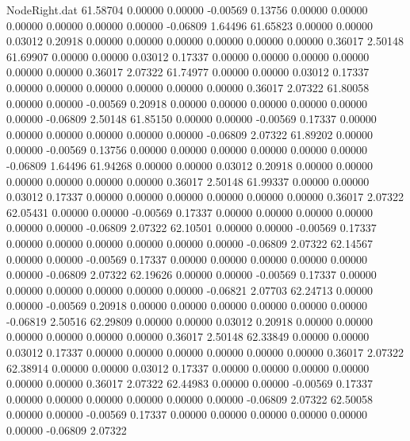 \begin{filecontents}{NodeRight.dat}
  61.58704    0.00000    0.00000    -0.00569    0.13756    0.00000    0.00000    0.00000    0.00000    0.00000    0.00000   -0.06809    1.64496
  61.65823    0.00000    0.00000     0.03012    0.20918    0.00000    0.00000    0.00000    0.00000    0.00000    0.00000    0.36017    2.50148
  61.69907    0.00000    0.00000     0.03012    0.17337    0.00000    0.00000    0.00000    0.00000    0.00000    0.00000    0.36017    2.07322
  61.74977    0.00000    0.00000     0.03012    0.17337    0.00000    0.00000    0.00000    0.00000    0.00000    0.00000    0.36017    2.07322
  61.80058    0.00000    0.00000    -0.00569    0.20918    0.00000    0.00000    0.00000    0.00000    0.00000    0.00000   -0.06809    2.50148
  61.85150    0.00000    0.00000    -0.00569    0.17337    0.00000    0.00000    0.00000    0.00000    0.00000    0.00000   -0.06809    2.07322
  61.89202    0.00000    0.00000    -0.00569    0.13756    0.00000    0.00000    0.00000    0.00000    0.00000    0.00000   -0.06809    1.64496
  61.94268    0.00000    0.00000     0.03012    0.20918    0.00000    0.00000    0.00000    0.00000    0.00000    0.00000    0.36017    2.50148
  61.99337    0.00000    0.00000     0.03012    0.17337    0.00000    0.00000    0.00000    0.00000    0.00000    0.00000    0.36017    2.07322
  62.05431    0.00000    0.00000    -0.00569    0.17337    0.00000    0.00000    0.00000    0.00000    0.00000    0.00000   -0.06809    2.07322
  62.10501    0.00000    0.00000    -0.00569    0.17337    0.00000    0.00000    0.00000    0.00000    0.00000    0.00000   -0.06809    2.07322
  62.14567    0.00000    0.00000    -0.00569    0.17337    0.00000    0.00000    0.00000    0.00000    0.00000    0.00000   -0.06809    2.07322
  62.19626    0.00000    0.00000    -0.00569    0.17337    0.00000    0.00000    0.00000    0.00000    0.00000    0.00000   -0.06821    2.07703
  62.24713    0.00000    0.00000    -0.00569    0.20918    0.00000    0.00000    0.00000    0.00000    0.00000    0.00000   -0.06819    2.50516
  62.29809    0.00000    0.00000     0.03012    0.20918    0.00000    0.00000    0.00000    0.00000    0.00000    0.00000    0.36017    2.50148
  62.33849    0.00000    0.00000     0.03012    0.17337    0.00000    0.00000    0.00000    0.00000    0.00000    0.00000    0.36017    2.07322
  62.38914    0.00000    0.00000     0.03012    0.17337    0.00000    0.00000    0.00000    0.00000    0.00000    0.00000    0.36017    2.07322
  62.44983    0.00000    0.00000    -0.00569    0.17337    0.00000    0.00000    0.00000    0.00000    0.00000    0.00000   -0.06809    2.07322
  62.50058    0.00000    0.00000    -0.00569    0.17337    0.00000    0.00000    0.00000    0.00000    0.00000    0.00000   -0.06809    2.07322

\end{filecontents}
